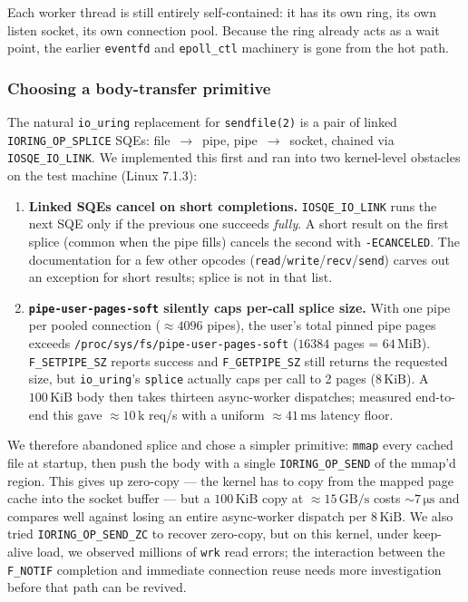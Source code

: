 \documentclass{article}
\begin{document}
Each worker thread is still entirely self-contained: it has its own ring, its own listen socket, its own connection pool. Because the ring already acts as a wait point, the earlier \texttt{eventfd} and \texttt{epoll\_ctl} machinery is gone from the hot path.

\subsubsection{Choosing a body-transfer primitive}
\label{sec:body}

The natural \texttt{io\_uring} replacement for \texttt{sendfile(2)} is a pair of linked
\texttt{IORING\_OP\_SPLICE} SQEs: file~$\to$~pipe, pipe~$\to$~socket, chained via
\texttt{IOSQE\_IO\_LINK}. We implemented this first and ran into two kernel-level
obstacles on the test machine (Linux 7.1.3):

\begin{enumerate}
    \item \textbf{Linked SQEs cancel on short completions.} \texttt{IOSQE\_IO\_LINK}
          runs the next SQE only if the previous one succeeds \emph{fully}. A short
          result on the first splice (common when the pipe fills) cancels the second
          with \texttt{-ECANCELED}. The documentation for a few other opcodes
          (\texttt{read}/\texttt{write}/\texttt{recv}/\texttt{send}) carves out an
          exception for short results; splice is not in that list.
    \item \textbf{\texttt{pipe-user-pages-soft} silently caps per-call splice size.}
          With one pipe per pooled connection ($\approx 4096$ pipes), the user's total
          pinned pipe pages exceeds \texttt{/proc/sys/fs/pipe-user-pages-soft}
          ($16384$ pages = $64\,\mathrm{MiB}$). \texttt{F\_SETPIPE\_SZ} reports success
          and \texttt{F\_GETPIPE\_SZ} still returns the requested size, but \texttt{io\_uring}'s
          \texttt{splice} actually caps per call to 2 pages ($8\,\mathrm{KiB}$). A
          $100\,\mathrm{KiB}$ body then takes thirteen async-worker dispatches; measured
          end-to-end this gave $\approx 10\,\mathrm{k}$ req/s with a uniform
          $\approx 41\,\mathrm{ms}$ latency floor.
\end{enumerate}

We therefore abandoned splice and chose a simpler primitive: \texttt{mmap} every
cached file at startup, then push the body with a single \texttt{IORING\_OP\_SEND} of
the mmap'd region. This gives up zero-copy --- the kernel has to copy from the mapped
page cache into the socket buffer --- but a $100\,\mathrm{KiB}$ copy at
$\approx 15\,\mathrm{GB/s}$ costs $\sim 7\,\mathrm{\mu s}$ and compares well against
losing an entire async-worker dispatch per $8\,\mathrm{KiB}$. We also tried
\texttt{IORING\_OP\_SEND\_ZC} to recover zero-copy, but on this kernel, under
keep-alive load, we observed millions of \texttt{wrk} read errors; the interaction
between the \texttt{F\_NOTIF} completion and immediate connection reuse needs more
investigation before that path can be revived.
\end{document}
